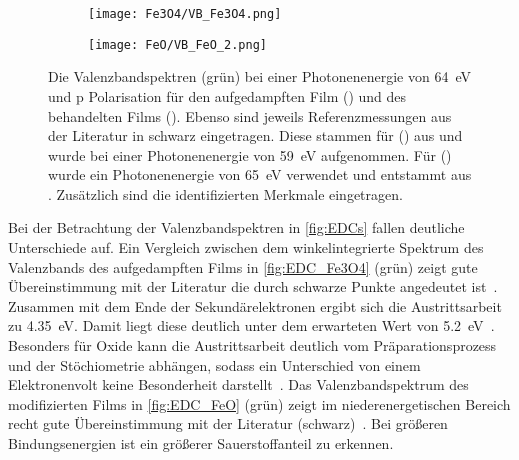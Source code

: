         \begin{figure}
            \begin{subfigure}[t]{0.48\textwidth}
                \centering
                \texttt{[image: Fe3O4/VB\_Fe3O4.png]}
                \subcaption{}
                \label{fig:EDC_Fe3O4}
            \end{subfigure}
            \begin{subfigure}[t]{0.48\textwidth}
                \centering
                \texttt{[image: FeO/VB\_FeO\_2.png]}
                \subcaption{}
                \label{fig:EDC_FeO}
            \end{subfigure}
            \caption{Die Valenzbandspektren (grün) bei einer Photonenenergie von \SI{64}{\electronvolt} und p Polarisation für den aufgedampften Film () und des behandelten Films ().
            Ebenso sind jeweils Referenzmessungen aus der Literatur in schwarz eingetragen.
            Diese stammen für () aus \cite{FeO_35} und wurde bei einer Photonenenergie von \SI{59}{\electronvolt} aufgenommen.
            Für () wurde ein Photonenenergie von \SI{65}{\electronvolt} verwendet und entstammt aus \cite{FeO_14}.
            Zusätzlich sind die identifizierten Merkmale eingetragen.}
            \label{fig:EDCs}
        \end{figure}
        Bei der Betrachtung der Valenzbandspektren in \autoref{fig:EDCs} fallen deutliche Unterschiede auf.     
        Ein Vergleich zwischen dem winkelintegrierte Spektrum des Valenzbands des aufgedampften Films in \autoref{fig:EDC_Fe3O4} (grün) zeigt gute Übereinstimmung mit der Literatur die durch schwarze Punkte angedeutet ist~\cite{FeO_35}.
        Zusammen mit dem Ende der Sekundärelektronen ergibt sich die Austrittsarbeit zu \SI{4.35}{\electronvolt}.
        Damit liegt diese deutlich unter dem erwarteten Wert von \SI{5.2}{\electronvolt}~\cite{FeO_40}.
        Besonders für Oxide kann die Austrittsarbeit deutlich vom Präparationsprozess und der Stöchiometrie abhängen, sodass ein Unterschied von einem Elektronenvolt keine Besonderheit darstellt~\cite{IF_11}.
        Das Valenzbandspektrum des modifizierten Films in \autoref{fig:EDC_FeO} (grün) zeigt im niederenergetischen Bereich recht gute Übereinstimmung mit der Literatur (schwarz)~\cite{FeO_14}.
        Bei größeren Bindungsenergien ist ein größerer Sauerstoffanteil zu erkennen.

